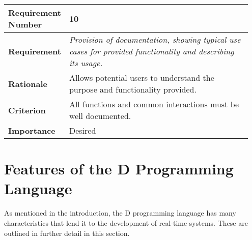 \begin{table}[!h]
\centering
\begin{tabular}{|L{0.2\linewidth}|L{0.75\linewidth}|}
\hline
\textbf{Requirement Number} & 10 \\ \hline
\textbf{Requirement} & \emph{Provision of documentation, showing typical use cases for provided 
                functionality and describing its usage.} \\ \hline
\textbf{Rationale}      & Allows potential users to understand the purpose and 
                functionality provided. \\ \hline
\textbf{Criterion}      & All functions and common interactions must be well documented. \\ \hline
\textbf{Importance}     & Desired \\ \hline
\end{tabular}
\end{table}
\FloatBarrier
\section{Features of the D Programming Language}
As mentioned in the introduction, the D programming language has many 
characteristics that lend it to the development of real-time systems.
These are outlined in further detail in this section. 

